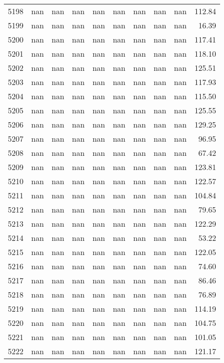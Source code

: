 \begin{tabular}{lrrrrrrrrr}
5198 & nan & nan & nan & nan & nan & nan & nan & nan & 112.84 \\
5199 & nan & nan & nan & nan & nan & nan & nan & nan & 16.39 \\
5200 & nan & nan & nan & nan & nan & nan & nan & nan & 117.41 \\
5201 & nan & nan & nan & nan & nan & nan & nan & nan & 118.10 \\
5202 & nan & nan & nan & nan & nan & nan & nan & nan & 125.51 \\
5203 & nan & nan & nan & nan & nan & nan & nan & nan & 117.93 \\
5204 & nan & nan & nan & nan & nan & nan & nan & nan & 115.50 \\
5205 & nan & nan & nan & nan & nan & nan & nan & nan & 125.55 \\
5206 & nan & nan & nan & nan & nan & nan & nan & nan & 129.25 \\
5207 & nan & nan & nan & nan & nan & nan & nan & nan & 96.95 \\
5208 & nan & nan & nan & nan & nan & nan & nan & nan & 67.42 \\
5209 & nan & nan & nan & nan & nan & nan & nan & nan & 123.81 \\
5210 & nan & nan & nan & nan & nan & nan & nan & nan & 122.57 \\
5211 & nan & nan & nan & nan & nan & nan & nan & nan & 104.84 \\
5212 & nan & nan & nan & nan & nan & nan & nan & nan & 79.65 \\
5213 & nan & nan & nan & nan & nan & nan & nan & nan & 122.29 \\
5214 & nan & nan & nan & nan & nan & nan & nan & nan & 53.22 \\
5215 & nan & nan & nan & nan & nan & nan & nan & nan & 122.05 \\
5216 & nan & nan & nan & nan & nan & nan & nan & nan & 74.60 \\
5217 & nan & nan & nan & nan & nan & nan & nan & nan & 86.46 \\
5218 & nan & nan & nan & nan & nan & nan & nan & nan & 76.89 \\
5219 & nan & nan & nan & nan & nan & nan & nan & nan & 114.19 \\
5220 & nan & nan & nan & nan & nan & nan & nan & nan & 104.75 \\
5221 & nan & nan & nan & nan & nan & nan & nan & nan & 101.05 \\
5222 & nan & nan & nan & nan & nan & nan & nan & nan & 121.17 \\

\end{tabular}
